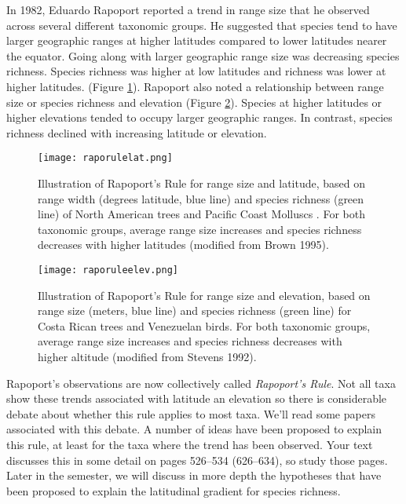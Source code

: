 \documentclass[11pt, hidelinks]{article}
\begin{document}
In 1982, Eduardo Rapoport reported a trend in range size that he observed across several different taxonomic groups.  He suggested that species tend to have larger geographic ranges at higher latitudes compared to lower latitudes nearer the equator. Going along with larger geographic range size was decreasing species richness.  Species richness was higher at low latitudes and richness was lower at higher latitudes.  (Figure \ref{raporulelat}). Rapoport also noted a relationship between range size or species richness and elevation (Figure \ref{raporuleelev}).  Species at higher latitudes or higher elevations tended to occupy larger geographic ranges.  In contrast, species richness declined with increasing latitude or elevation.

\begin{figure}
	\centering
		\texttt{[image: raporulelat.png]}  
		\caption{Illustration of Rapoport's Rule for range size and latitude, based on range width (degrees latitude, blue line) and species richness (green line) of North American trees and Pacific Coast Molluscs . For both taxonomic groups, average range size increases and species richness decreases with higher latitudes (modified from Brown 1995).\label{raporulelat}}
		
\end{figure}

\begin{figure}
	\centering
		\texttt{[image: raporuleelev.png]}  
		\caption{Illustration of Rapoport's Rule for range size and elevation, based on range size (meters, blue line) and species richness (green line) for Costa Rican trees and Venezuelan birds. For both taxonomic groups, average range size increases and species richness decreases with higher altitude (modified from Stevens 1992).\label{raporuleelev}}
\end{figure}

Rapoport's observations are now collectively called \emph{Rapoport's Rule}.  Not all taxa show these trends associated with latitude an elevation so there is considerable debate about whether this rule applies to most taxa. We'll read some papers associated with this debate.  A number of ideas have been proposed to explain this rule, at least for the taxa where the trend has been observed.  Your text discusses this in some detail on pages 526--534 (626--634), so study those pages.  Later in the semester, we will discuss in more depth the hypotheses that have been proposed to explain the latitudinal gradient for species richness.
\end{document}
